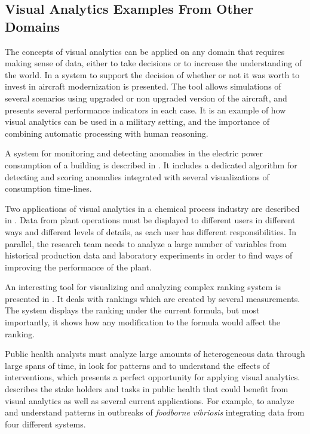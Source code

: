 \subsection{Visual Analytics Examples From Other Domains}


The concepts of visual analytics can be applied on any domain that requires making sense of data, either to take decisions or to increase the understanding of the world. 
In \autocite{soban_visual_2011} a system to support the decision of whether or not it was worth to invest in aircraft modernization is presented. The tool allows simulations of several scenarios using upgraded or non upgraded version of the aircraft, and presents several performance indicators in each case. It is an example of how visual analytics can be used in a military setting, and the importance of combining automatic processing with human reasoning.

A system for monitoring and detecting anomalies in the electric power consumption of a building is described in \autocite{janetzko_anomaly_2014}. It includes a dedicated algorithm for detecting and scoring anomalies integrated with several visualizations of consumption time-lines.

Two applications of visual analytics in a chemical process industry are described in \autocite{stahl_overview_2013}. Data from plant operations must be displayed to different users in different ways and different levels of details, as each user has different responsibilities. In parallel, the research team needs to analyze a large number of variables from historical production data and laboratory experiments in order to find ways of improving the performance of the plant.

An interesting tool for visualizing and analyzing complex ranking system is presented in \autocite{gratzl_lineup:_2013}. It deals with rankings which are created by several measurements. The system displays the ranking under the current formula, but most importantly, it shows how any modification to the formula would affect the ranking.

Public health analysts must analyze large amounts of heterogeneous data through large spans of time, in look for patterns and to understand the effects of interventions, which presents a perfect opportunity for applying visual analytics. \autocite{sedig_challenge_2014} describes the stake holders and tasks in public health that could benefit from visual analytics as well as several current applications. For example, to analyze and understand patterns in outbreaks of \emph{foodborne vibriosis} integrating data from four different systems.

